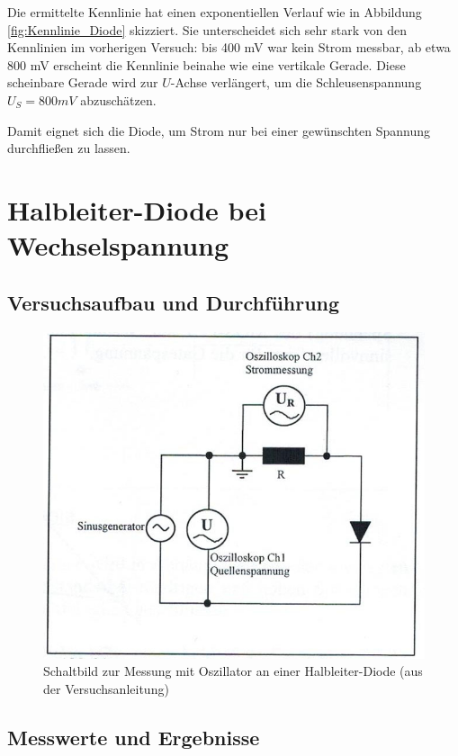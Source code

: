 \documentclass{scrartcl}
\begin{document}
Die ermittelte Kennlinie hat einen exponentiellen Verlauf wie in Abbildung \ref{fig:Kennlinie_Diode} skizziert. Sie unterscheidet sich sehr stark von den Kennlinien im vorherigen Versuch: bis 400 mV war kein Strom messbar, ab etwa 800 mV erscheint die Kennlinie beinahe wie eine vertikale Gerade. Diese scheinbare Gerade wird zur $U$-Achse verlängert, um die Schleusenspannung $U_{S} = 800 mV$ abzuschätzen.

Damit eignet sich die Diode, um Strom nur bei einer gewünschten Spannung durchfließen zu lassen. 


\pagebreak
\section{Halbleiter-Diode bei Wechselspannung}
\subsection{Versuchsaufbau und Durchführung}

\begin{figure}[H]
  \centering
    \includegraphics[scale=0.75]{Aufbau3.JPG}
  \caption{Schaltbild zur Messung mit Oszillator an einer Halbleiter-Diode (aus der Versuchsanleitung)}
  \label{fig:Aufbau3}
\end{figure}

\subsection{Messwerte und Ergebnisse}
\end{document}
